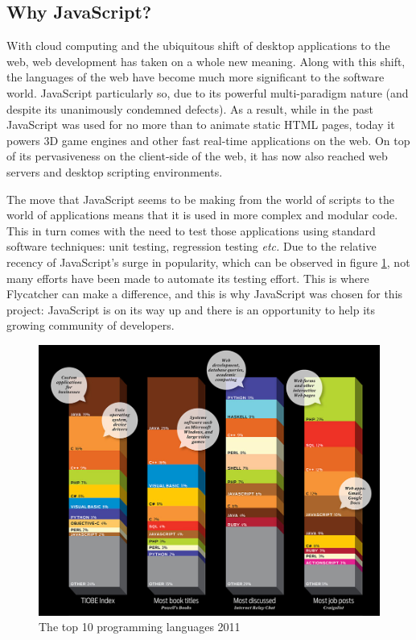 \subsection{Why JavaScript?}

With cloud computing and the ubiquitous shift of desktop applications to the web, web development has taken on a whole new meaning. Along with this shift, the languages of the web have become much more significant to the software world. JavaScript particularly so, due to its powerful multi-paradigm nature (and despite its unanimously condemned defects). As a result, while in the past JavaScript was used for no more than to animate static HTML pages, today it powers 3D game engines and other fast real-time applications on the web. On top of its pervasiveness on the client-side of the web, it has now also reached web servers and desktop scripting environments.

The move that JavaScript seems to be making from the world of scripts to the world of applications means that it is used in more complex and modular code. This in turn comes with the need to test those applications using standard software techniques: unit testing, regression testing \emph{etc.} Due to the relative recency of JavaScript's surge in popularity, which can be observed in figure \ref{TIOBEgraph}, not many efforts have been made to automate its testing effort. This is where \textsf{Flycatcher} can make a difference, and this is why JavaScript was chosen for this project: JavaScript is on its way up and there is an opportunity to help its growing community of developers.

\begin{figure}
\hspace*{-1.2cm}
\centering
\includegraphics[scale=0.45]{./components/chapter2/TIOBEgraph.jpeg}
\caption{The top 10 programming languages 2011 \cite{tiobe}}
\label{TIOBEgraph}
\end{figure}


